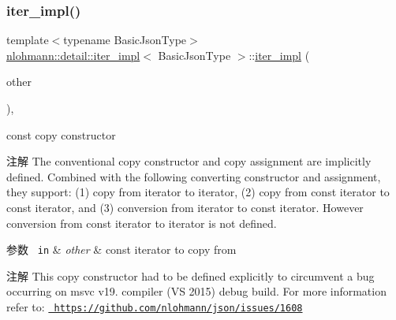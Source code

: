 \subsubsection{\texorpdfstring{iter\_impl()}{iter\_impl()}\hspace{0.1cm}{\footnotesize\ttfamily [3/4]}}
{\footnotesize\ttfamily template$<$typename Basic\+Json\+Type$>$ \\
\mbox{\hyperlink{classnlohmann_1_1detail_1_1iter__impl}{nlohmann\+::detail\+::iter\+\_\+impl}}$<$ Basic\+Json\+Type $>$\+::\mbox{\hyperlink{classnlohmann_1_1detail_1_1iter__impl}{iter\+\_\+impl}} (\begin{DoxyParamCaption}\item[{const \mbox{\hyperlink{classnlohmann_1_1detail_1_1iter__impl}{iter\+\_\+impl}}$<$ const Basic\+Json\+Type $>$ \&}]{other }\end{DoxyParamCaption})\hspace{0.3cm}{\ttfamily [inline]}, {\ttfamily [noexcept]}}



const copy constructor 

\begin{DoxyNote}{注解}
The conventional copy constructor and copy assignment are implicitly defined. Combined with the following converting constructor and assignment, they support\+: (1) copy from iterator to iterator, (2) copy from const iterator to const iterator, and (3) conversion from iterator to const iterator. However conversion from const iterator to iterator is not defined.
\end{DoxyNote}

\begin{DoxyParams}[1]{参数}
\mbox{\texttt{ in}}  & {\em other} & const iterator to copy from \\
\hline
\end{DoxyParams}
\begin{DoxyNote}{注解}
This copy constructor had to be defined explicitly to circumvent a bug occurring on msvc v19. compiler (VS 2015) debug build. For more information refer to\+: \href{https://github.com/nlohmann/json/issues/1608}{\texttt{ https\+://github.\+com/nlohmann/json/issues/1608}} 
\end{DoxyNote}
\mbox{\label{classnlohmann_1_1detail_1_1iter__impl_a867f7eb55091be31b013adb3e46816d3}} 
